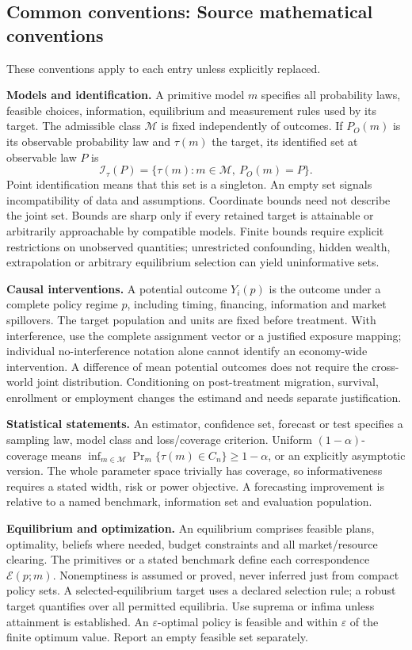 \documentclass[11pt,a4paper]{article}
\begin{document}
\subsection*{Common conventions: Source mathematical conventions}

These conventions apply to each entry unless explicitly replaced.

\textbf{Models and identification.} A primitive model \(m\) specifies all probability laws, feasible choices, information, equilibrium and measurement rules used by its target. The admissible class \(\mathcal M\) is fixed independently of outcomes. If \(P_O(m)\) is its observable probability law and \(\tau(m)\) the target, its identified set at observable law \(P\) is
\[
 \mathcal I_\tau(P)=\{\tau(m):m\in\mathcal M,\ P_O(m)=P\}.
\]
Point identification means that this set is a singleton. An empty set signals incompatibility of data and assumptions. Coordinate bounds need not describe the joint set. Bounds are sharp only if every retained target is attainable or arbitrarily approachable by compatible models. Finite bounds require explicit restrictions on unobserved quantities; unrestricted confounding, hidden wealth, extrapolation or arbitrary equilibrium selection can yield uninformative sets.

\textbf{Causal interventions.} A potential outcome \(Y_i(p)\) is the outcome under a complete policy regime \(p\), including timing, financing, information and market spillovers. The target population and units are fixed before treatment. With interference, use the complete assignment vector or a justified exposure mapping; individual no-interference notation alone cannot identify an economy-wide intervention. A difference of mean potential outcomes does not require the cross-world joint distribution. Conditioning on post-treatment migration, survival, enrollment or employment changes the estimand and needs separate justification.

\textbf{Statistical statements.} An estimator, confidence set, forecast or test specifies a sampling law, model class and loss/coverage criterion. Uniform \((1-\alpha)\)-coverage means \(\inf_{m\in\mathcal M}\Pr_m\{\tau(m)\in C_n\}\geq1-\alpha\), or an explicitly asymptotic version. The whole parameter space trivially has coverage, so informativeness requires a stated width, risk or power objective. A forecasting improvement is relative to a named benchmark, information set and evaluation population.

\textbf{Equilibrium and optimization.} An equilibrium comprises feasible plans, optimality, beliefs where needed, budget constraints and all market/resource clearing. The primitives or a stated benchmark define each correspondence \(\mathcal E(p;m)\). Nonemptiness is assumed or proved, never inferred just from compact policy sets. A selected-equilibrium target uses a declared selection rule; a robust target quantifies over all permitted equilibria. Use suprema or infima unless attainment is established. An \(\varepsilon\)-optimal policy is feasible and within \(\varepsilon\) of the finite optimum value. Report an empty feasible set separately.
\end{document}
